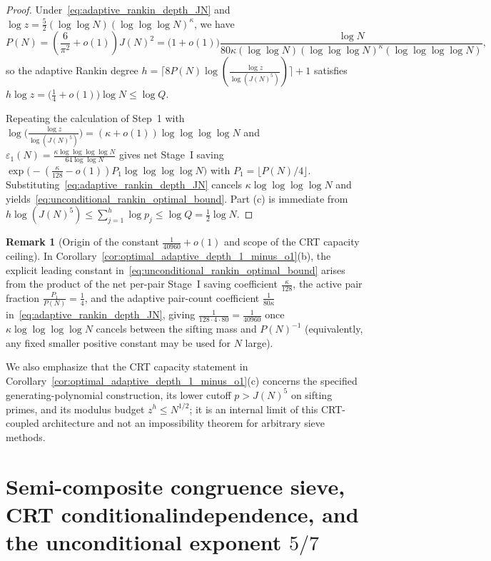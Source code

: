 \documentclass[11pt, a4paper]{article}
\theoremstyle{plain}
\theoremstyle{definition}
\newtheorem{remark}[theorem]{Remark}
\begin{document}
\begin{proof}
Under~\eqref{eq:adaptive_rankin_depth_JN} and $\log z=\frac52(\log\log N)(\log\log\log N)^{\kappa}$, we have 
\[
P(N)=\left(\frac{6}{\pi^{2}}+o(1)\right)J(N)^{2}=\big(1+o(1)\big)\frac{\log N}{80\kappa(\log\log N)(\log\log\log N)^{\kappa}(\log\log\log\log N)},
\]
so the adaptive Rankin degree $h=\lceil 8P(N)\log(\frac{\log z}{\log(J(N)^{5})})\rceil+1$ satisfies $h\log z=\big(\frac14+o(1)\big)\log N\le\log Q$. 

Repeating the calculation of Step~1 with $\log\big(\frac{\log z}{\log(J(N)^{5})}\big)=(\kappa+o(1))\log\log\log\log N$ and $\varepsilon_1(N)=\frac{\kappa\log\log\log\log N}{64\log\log N}$ gives net Stage~I saving $\exp\big(-(\frac{\kappa}{128}-o(1))P_1\log\log\log\log N\big)$ with $P_1=\lfloor P(N)/4\rfloor$. Substituting~\eqref{eq:adaptive_rankin_depth_JN} cancels $\kappa\log\log\log\log N$ and yields~\eqref{eq:unconditional_rankin_optimal_bound}. Part (c) is immediate from $h\log(J(N)^{5})\le\sum_{j=1}^{h}\log p_j\le\log Q=\frac12\log N$.
\end{proof}

\begin{remark}[Origin of the constant $\frac{1}{40960}+o(1)$ and scope of the CRT capacity ceiling]
In Corollary~\ref{cor:optimal_adaptive_depth_1_minus_o1}(b), the explicit leading constant in~\eqref{eq:unconditional_rankin_optimal_bound} arises from the product of the net per-pair Stage~I saving coefficient $\frac{\kappa}{128}$, the active pair fraction $\frac{P_1}{P(N)}=\frac14$, and the adaptive pair-count coefficient $\frac{1}{80\kappa}$ in~\eqref{eq:adaptive_rankin_depth_JN}, giving $\frac{1}{128\cdot 4\cdot 80}=\frac{1}{40960}$ once $\kappa\log\log\log\log N$ cancels between the sifting mass and $P(N)^{-1}$ (equivalently, any fixed smaller positive constant may be used for $N$ large). 

We also emphasize that the CRT capacity statement in Corollary~\ref{cor:optimal_adaptive_depth_1_minus_o1}(c) concerns the specified generating-polynomial construction, its lower cutoff $p>J(N)^{5}$ on sifting primes, and its modulus budget $z^{h}\le N^{1/2}$; it is an internal limit of this CRT-coupled architecture and not an impossibility theorem for arbitrary sieve methods.
\end{remark}


\section[Semi-composite congruence sieve, CRT conditional independence, and the unconditional exponent $5/7$]{Semi-composite congruence sieve, CRT conditional\linebreak independence, and the unconditional exponent $5/7$}\label{sec:semi_composite_5_7}
\end{document}
